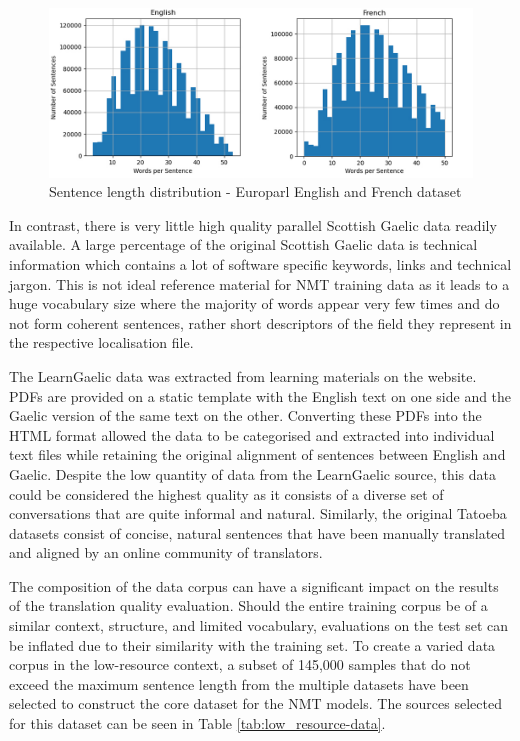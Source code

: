 \begin{figure}[ht!]
\centering
\includegraphics[width=1\textwidth]{media/methodology/s_length-1-en_fr.jpg}
\captionsetup{justification=centering}
\caption[Diagram of the Europarl dataset sentence length distribution]{Sentence length distribution - Europarl English and French dataset} %
\label{fig:sentence_length-french_legal}
\end{figure}

In contrast, there is very little high quality parallel Scottish Gaelic data readily available. A large percentage of the original Scottish Gaelic data is technical information which contains a lot of software specific keywords, links and technical jargon. This is not ideal reference material for \acrshort{NMT} training data as it leads to a huge vocabulary size where the majority of words appear very few times and do not form coherent sentences, rather short descriptors of the field they represent in the respective localisation file. 

The LearnGaelic data was extracted from learning materials on the \cite{learn_gaelic_2019} website. PDFs are provided on a static template with the English text on one side and the Gaelic version of the same text on the other. Converting these PDFs into the HTML format allowed the data to be categorised and extracted into individual text files while retaining the original alignment of sentences between English and Gaelic.
Despite the low quantity of data from the LearnGaelic source, this data could be considered the highest quality as it consists of a diverse set of conversations that are quite informal and natural. Similarly, the original Tatoeba datasets consist of concise, natural sentences that have been manually translated and aligned by an online community of translators.

The composition of the data corpus can have a significant impact on the results of the translation quality evaluation. Should the entire training corpus be of a similar context, structure, and limited vocabulary, evaluations on the test set can be inflated due to their similarity with the training set.
To create a varied data corpus in the low-resource context, a subset of 145,000 samples that do not exceed the maximum sentence length from the multiple datasets have been selected to construct the core dataset for the \acrshort{NMT} models. The sources selected for this dataset can be seen in Table \ref{tab:low_resource-data}.

